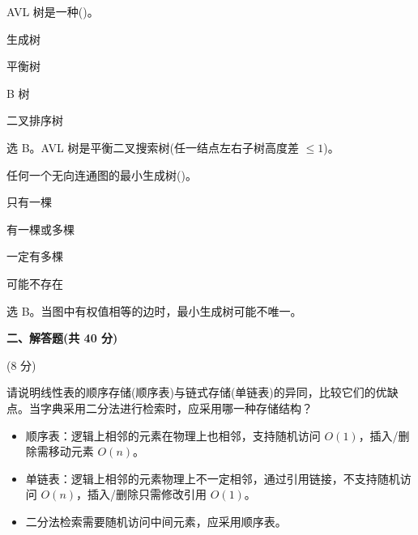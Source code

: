 \begin{question}
AVL 树是一种(\quad)。
\begin{choiceoptions}[2]
  \item 生成树
  \item 平衡树
  \item B 树
  \item 二叉排序树
\end{choiceoptions}
\begin{solution}
选 B。AVL 树是平衡二叉搜索树(任一结点左右子树高度差 $\le1$)。
\end{solution}
\end{question}

\begin{question}
任何一个无向连通图的最小生成树(\quad)。
\begin{choiceoptions}[2]
  \item 只有一棵
  \item 有一棵或多棵
  \item 一定有多棵
  \item 可能不存在
\end{choiceoptions}
\begin{solution}
选 B。当图中有权值相等的边时，最小生成树可能不唯一。
\end{solution}
\end{question}

\clearpage

\textbf{二、解答题(共 40 分)}

\begin{question}[线性表存储结构比较](8 分)

请说明线性表的顺序存储(顺序表)与链式存储(单链表)的异同，比较它们的优缺点。当字典采用二分法进行检索时，应采用哪一种存储结构？

\begin{solution}
\begin{itemize}
  \item 顺序表：逻辑上相邻的元素在物理上也相邻，支持随机访问 $O(1)$，插入/删除需移动元素 $O(n)$。
  \item 单链表：逻辑上相邻的元素物理上不一定相邻，通过引用链接，不支持随机访问 $O(n)$，插入/删除只需修改引用 $O(1)$。
  \item 二分法检索需要随机访问中间元素，应采用顺序表。
\end{itemize}
\end{solution}
\end{question}


